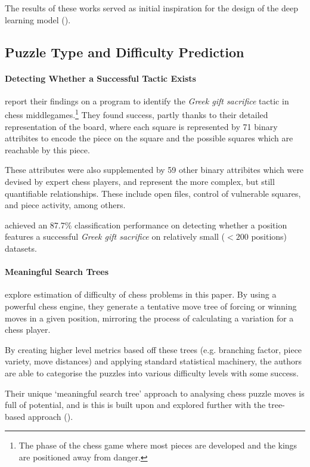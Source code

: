 The results of these works served as initial inspiration for the design of the
deep learning model ().

\subsection{Puzzle Type and Difficulty Prediction}\label{typeAndDifficultyReview}

\paragraph{Detecting Whether a Successful Tactic
Exists}\citet{middleGamePatterns} report their findings on a program to
identify the \emph{Greek gift sacrifice} tactic in chess
middlegames.\footnote{The phase of the chess game where most pieces are
developed and the kings are positioned away from danger.} They found success,
partly thanks to their detailed representation of the board, where each square
is represented by 71 binary attribites \citep{middleGamePatterns} to encode the
piece on the square and the possible squares which are reachable by this piece. 

These attributes were also supplemented by 59 other binary attribites which
were devised by expert chess players, and represent the more complex, but still
quantifiable relationships. These include open files, control of vulnerable
squares, and piece activity, among others.

\citet{middleGamePatterns} achieved an 87.7\% classification performance on
detecting whether a position features a successful \emph{Greek gift sacrifice}
on relatively small ($<200$ positions) datasets. 

\paragraph{Meaningful Search Trees}\citet{chessTrees} explore estimation of
difficulty of chess problems in this paper. By using a powerful chess engine,
they generate a tentative move tree of forcing or winning moves in a given
position, mirroring the process of calculating a variation for a chess player. 

By creating higher level metrics based off these trees (e.g. branching factor,
piece variety, move distances) and applying standard statistical machinery, the
authors are able to categorise the puzzles into various difficulty levels with
some success.

Their unique `meaningful search tree' \citep{chessTrees} approach to analysing
chess puzzle moves is full of potential, and is this is built upon and explored
further with the tree-based approach ().

